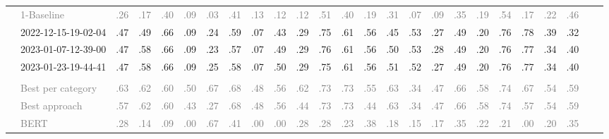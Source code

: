 \begin{table*}
\begin{tabular}{@{}ll@{\hspace{10pt}}c@{\hspace{5pt}}cccccccccccccccccccccc@{}}
& \textcolor{gray}{1-Baseline} & \textcolor{gray}{.26} & \textcolor{gray}{.17} & \textcolor{gray}{.40} & \textcolor{gray}{.09} & \textcolor{gray}{.03} & \textcolor{gray}{.41} & \textcolor{gray}{.13} & \textcolor{gray}{.12} & \textcolor{gray}{.12} & \textcolor{gray}{.51} & \textcolor{gray}{.40} & \textcolor{gray}{.19} & \textcolor{gray}{.31} & \textcolor{gray}{.07} & \textcolor{gray}{.09} & \textcolor{gray}{.35} & \textcolor{gray}{.19} & \textcolor{gray}{.54} & \textcolor{gray}{.17} & \textcolor{gray}{.22} & \textcolor{gray}{.46} \\
& 2022-12-15-19-02-04 & .47 & .49 & .66 & .09 & .24 & .59 & .07 & .43 & .29 & .75 & .61 & .56 & .45 & .53 & .27 & .49 & .20 & .76 & .78 & .39 & .32 \\
& 2023-01-07-12-39-00 & .47 & .58 & .66 & .09 & .23 & .57 & .07 & .49 & .29 & .76 & .61 & .56 & .50 & .53 & .28 & .49 & .20 & .76 & .77 & .34 & .40 \\
& 2023-01-23-19-44-41 & .47 & .58 & .66 & .09 & .25 & .58 & .07 & .50 & .29 & .75 & .61 & .56 & .51 & .52 & .27 & .49 & .20 & .76 & .77 & .34 & .40 \\
\addlinespace
\multicolumn{2}{@{}l}{\emph{Nahj al-Balagha}} \\
& \textcolor{gray}{Best per category} & \textcolor{gray}{.63} & \textcolor{gray}{.62} & \textcolor{gray}{.60} & \textcolor{gray}{.50} & \textcolor{gray}{.67} & \textcolor{gray}{.68} & \textcolor{gray}{.48} & \textcolor{gray}{.56} & \textcolor{gray}{.62} & \textcolor{gray}{.73} & \textcolor{gray}{.73} & \textcolor{gray}{.55} & \textcolor{gray}{.63} & \textcolor{gray}{.34} & \textcolor{gray}{.47} & \textcolor{gray}{.66} & \textcolor{gray}{.58} & \textcolor{gray}{.74} & \textcolor{gray}{.67} & \textcolor{gray}{.54} & \textcolor{gray}{.59} \\
& \textcolor{gray}{Best approach} & \textcolor{gray}{.57} & \textcolor{gray}{.62} & \textcolor{gray}{.60} & \textcolor{gray}{.43} & \textcolor{gray}{.27} & \textcolor{gray}{.68} & \textcolor{gray}{.48} & \textcolor{gray}{.56} & \textcolor{gray}{.44} & \textcolor{gray}{.73} & \textcolor{gray}{.73} & \textcolor{gray}{.44} & \textcolor{gray}{.63} & \textcolor{gray}{.34} & \textcolor{gray}{.47} & \textcolor{gray}{.66} & \textcolor{gray}{.58} & \textcolor{gray}{.74} & \textcolor{gray}{.57} & \textcolor{gray}{.54} & \textcolor{gray}{.59} \\
& \textcolor{gray}{BERT} & \textcolor{gray}{.28} & \textcolor{gray}{.14} & \textcolor{gray}{.09} & \textcolor{gray}{.00} & \textcolor{gray}{.67} & \textcolor{gray}{.41} & \textcolor{gray}{.00} & \textcolor{gray}{.00} & \textcolor{gray}{.28} & \textcolor{gray}{.28} & \textcolor{gray}{.23} & \textcolor{gray}{.38} & \textcolor{gray}{.18} & \textcolor{gray}{.15} & \textcolor{gray}{.17} & \textcolor{gray}{.35} & \textcolor{gray}{.22} & \textcolor{gray}{.21} & \textcolor{gray}{.00} & \textcolor{gray}{.20} & \textcolor{gray}{.35} \\

\end{tabular}
\end{table*}
